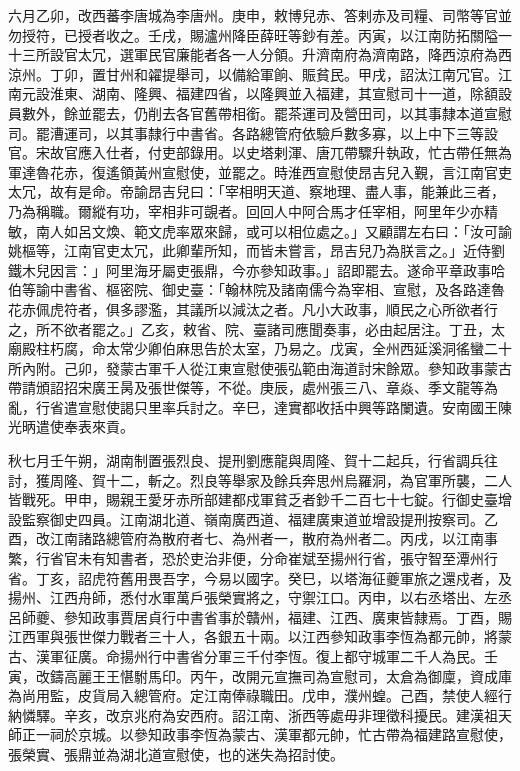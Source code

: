 \begin{pinyinscope}
 六月乙卯，改西蕃李唐城為李唐州。庚申，敕博兒赤、答剌赤及司糧、司幣等官並勿授符，已授者收之。壬戌，賜瀘州降臣薛旺等鈔有差。丙寅，以江南防拓關隘一十三所設官太冗，選軍民官廉能者各一人分領。升濟南府為濟南路，降西涼府為西涼州。丁卯，置甘州和糴提舉司，以備給軍餉、賑貧民。甲戌，詔汰江南冗官。江南元設淮東、湖南、隆興、福建四省，以隆興並入福建，其宣慰司十一道，除額設員數外，餘並罷去，仍削去各官舊帶相銜。罷茶運司及營田司，以其事隸本道宣慰司。罷漕運司，以其事隸行中書省。各路總管府依驗戶數多寡，以上中下三等設官。宋故官應入仕者，付吏部錄用。以史塔剌渾、唐兀帶驟升執政，忙古帶任無為軍達魯花赤，復遙領黃州宣慰使，並罷之。時淮西宣慰使昂吉兒入覲，言江南官吏太冗，故有是命。帝諭昂吉兒曰：「宰相明天道、察地理、盡人事，能兼此三者，乃為稱職。爾縱有功，宰相非可覬者。回回人中阿合馬才任宰相，阿里年少亦精敏，南人如呂文煥、範文虎率眾來歸，或可以相位處之。」又顧謂左右曰：「汝可諭姚樞等，江南官吏太冗，此卿輩所知，而皆未嘗言，昂吉兒乃為朕言之。」近侍劉鐵木兒因言：」阿里海牙屬吏張鼎，今亦參知政事。」詔即罷去。遂命平章政事哈伯等諭中書省、樞密院、御史臺：「翰林院及諸南儒今為宰相、宣慰，及各路達魯花赤佩虎符者，俱多謬濫，其議所以減汰之者。凡小大政事，順民之心所欲者行之，所不欲者罷之。」乙亥，敕省、院、臺諸司應聞奏事，必由起居注。丁丑，太廟殿柱朽腐，命太常少卿伯麻思告於太室，乃易之。戊寅，全州西延溪洞徭蠻二十所內附。己卯，發蒙古軍千人從江東宣慰使張弘範由海道討宋餘眾。參知政事蒙古帶請頒詔招宋廣王昺及張世傑等，不從。庚辰，處州張三八、章焱、季文龍等為亂，行省遣宣慰使謁只里率兵討之。辛巳，達實都收括中興等路闌遺。安南國王陳光昞遣使奉表來貢。



 秋七月壬午朔，湖南制置張烈良、提刑劉應龍與周隆、賀十二起兵，行省調兵往討，獲周隆、賀十二，斬之。烈良等舉家及餘兵奔思州烏羅洞，為官軍所襲，二人皆戰死。甲申，賜親王愛牙赤所部建都戍軍貧乏者鈔千二百七十七錠。行御史臺增設監察御史四員。江南湖北道、嶺南廣西道、福建廣東道並增設提刑按察司。乙酉，改江南諸路總管府為散府者七、為州者一，散府為州者二。丙戌，以江南事繁，行省官未有知書者，恐於吏治非便，分命崔斌至揚州行省，張守智至潭州行省。丁亥，詔虎符舊用畏吾字，今易以國字。癸巳，以塔海征夔軍旅之還戍者，及揚州、江西舟師，悉付水軍萬戶張榮實將之，守禦江口。丙申，以右丞塔出、左丞呂師夔、參知政事賈居貞行中書省事於贛州，福建、江西、廣東皆隸焉。丁酉，賜江西軍與張世傑力戰者三十人，各銀五十兩。以江西參知政事李恆為都元帥，將蒙古、漢軍征廣。命揚州行中書省分軍三千付李恆。復上都守城軍二千人為民。壬寅，改鑄高麗王王愖駙馬印。丙午，改開元宣撫司為宣慰司，太倉為御廩，資成庫為尚用監，皮貨局入總管府。定江南俸祿職田。戊申，濮州蝗。己酉，禁使人經行納憐驛。辛亥，改京兆府為安西府。詔江南、浙西等處毋非理徵科擾民。建漢祖天師正一祠於京城。以參知政事李恆為蒙古、漢軍都元帥，忙古帶為福建路宣慰使，張榮實、張鼎並為湖北道宣慰使，也的迷失為招討使。




\end{pinyinscope}
